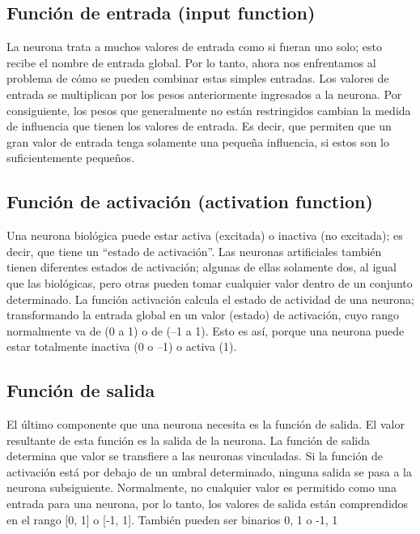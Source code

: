 \subsection{Función de entrada (input function)}
La neurona trata a muchos valores de entrada como si fueran uno solo; esto
recibe el nombre de entrada global. Por lo tanto, ahora nos enfrentamos al problema de cómo se pueden combinar estas simples entradas.
Los valores de entrada se multiplican por los pesos anteriormente ingresados a la neurona. Por consiguiente, los pesos que generalmente no están restringidos cambian la medida de influencia que tienen los valores de entrada. Es decir, que permiten que un gran valor de entrada tenga solamente una pequeña influencia, si estos son lo suficientemente pequeños.


\subsection{Función de activación (activation function)}
Una neurona biológica puede estar activa (excitada) o inactiva (no excitada); es decir, que tiene un “estado de activación”. Las neuronas artificiales también tienen diferentes estados de activación; algunas de ellas solamente dos, al igual que las biológicas, pero otras pueden tomar cualquier valor dentro de un conjunto determinado.
La función activación calcula el estado de actividad de una neurona; transformando la entrada global en un valor (estado) de activación, cuyo rango normalmente va de (0 a 1) o de (–1 a 1). Esto es así, porque una neurona puede estar totalmente inactiva (0 o –1) o activa (1).

\subsection{Función de salida}
El último componente que una neurona necesita es la función de salida. El valor resultante de esta función es la salida de la neurona. La función de
salida determina que valor se transfiere a las neuronas vinculadas. Si la función de activación está por debajo de un umbral determinado, ninguna salida se pasa a la neurona subsiguiente. Normalmente, no cualquier valor es permitido como una entrada para una neurona, por lo tanto, los valores de salida están comprendidos en el rango [0, 1] o [-1, 1]. También pueden ser binarios {0, 1} o {-1, 1}

\newpage
